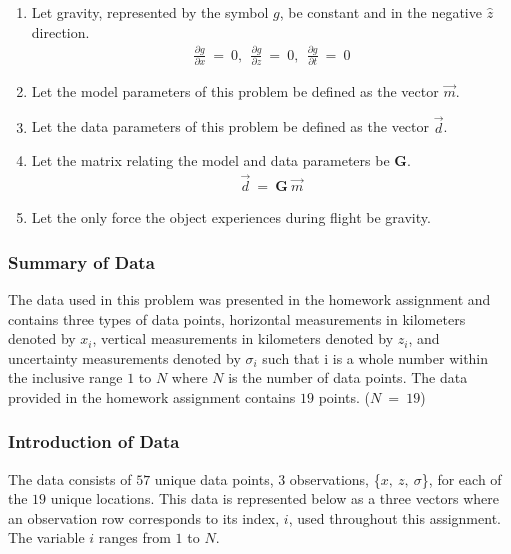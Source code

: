 \documentclass[12pt,runningheads]{article}
\begin{document}
\begin{enumerate}
\item Let gravity, represented by the symbol $g$, be constant and in the negative $\hat{z}$ direction.
\begin{align*}
\frac{\partial g}{\partial x}\ =\ 0 ,\ \ \frac{\partial g}{\partial z}\ =\ 0,\ \ \frac{\partial g}{\partial t}\ =\ 0
\end{align*}

\item Let the model parameters of this problem be defined as the vector $\vec{m}$.

\item Let the data parameters of this problem be defined as the vector $\vec{d}$.

\item Let the matrix relating the model and data parameters be $\textbf{G}$.
\begin{align*}
\vec{d}\ =\ \textbf{G}\ \vec{m}
\end{align*}

\item Let the only force the object experiences during flight be gravity.
\end{enumerate}

\subsubsection*{Summary of Data}
The data used in this problem was presented in the homework assignment and contains three types of data points, horizontal measurements in kilometers denoted by $x_{i}$, vertical measurements in kilometers denoted by $z_{i}$, and uncertainty measurements denoted by $\sigma_{i}$ such that i is a whole number within the inclusive range $1$ to $N$ where $N$ is the number of data points. The data provided in the homework assignment contains $19$ points. ($N\ =\ 19$)

\pagebreak

\subsubsection*{Introduction of Data}
The data consists of $57$ unique data points, $3$ observations, \{$x,\ z,\ \sigma$\}, for each of the $19$ unique locations. This data is represented below as a three vectors where an observation row corresponds to its index, $i$, used throughout this assignment. The variable $i$ ranges from $1$ to $N$.
\end{document}
